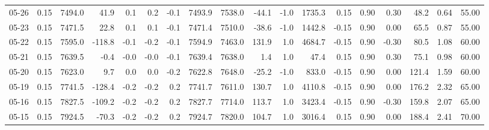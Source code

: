 \begin{threeparttable}
{\begin{tabular}{lrrrrrrrrrrrrrrrrr}
  05-26 &     0.15 & 7494.0 &              41.9 &               0.1 &                0.2 &               -0.1 & 7493.9 & 7538.0 &      -44.1 &                     -1.0 &              1735.3 &       0.15 &      0.90 &           0.30 &             48.2 &            0.64 &                  55.00 \\
  05-23 &     0.15 & 7471.5 &              22.8 &               0.1 &                0.1 &               -0.1 & 7471.4 & 7510.0 &      -38.6 &                     -1.0 &              1442.8 &      -0.15 &      0.90 &           0.00 &             65.5 &            0.87 &                  55.00 \\
  05-22 &     0.15 & 7595.0 &            -118.8 &              -0.1 &               -0.2 &               -0.1 & 7594.9 & 7463.0 &      131.9 &                      1.0 &              4684.7 &      -0.15 &      0.90 &          -0.30 &             80.5 &            1.08 &                  60.00 \\
  05-21 &     0.15 & 7639.5 &              -0.4 &              -0.0 &               -0.0 &               -0.1 & 7639.4 & 7638.0 &        1.4 &                      1.0 &                47.4 &       0.15 &      0.90 &           0.30 &             75.1 &            0.98 &                  60.00 \\
  05-20 &     0.15 & 7623.0 &               9.7 &               0.0 &                0.0 &               -0.2 & 7622.8 & 7648.0 &      -25.2 &                     -1.0 &               833.0 &      -0.15 &      0.90 &           0.00 &            121.4 &            1.59 &                  60.00 \\
  05-19 &     0.15 & 7741.5 &            -128.4 &              -0.2 &               -0.2 &                0.2 & 7741.7 & 7611.0 &      130.7 &                      1.0 &              4110.8 &      -0.15 &      0.90 &           0.00 &            176.2 &            2.32 &                  65.00 \\
  05-16 &     0.15 & 7827.5 &            -109.2 &              -0.2 &               -0.2 &                0.2 & 7827.7 & 7714.0 &      113.7 &                      1.0 &              3423.4 &      -0.15 &      0.90 &          -0.30 &            159.8 &            2.07 &                  65.00 \\
  05-15 &     0.15 & 7924.5 &             -70.3 &              -0.2 &               -0.2 &                0.2 & 7924.7 & 7820.0 &      104.7 &                      1.0 &              3016.4 &       0.15 &      0.90 &           0.00 &            188.4 &            2.41 &                  70.00 \\

\end{tabular}}
\end{threeparttable}
